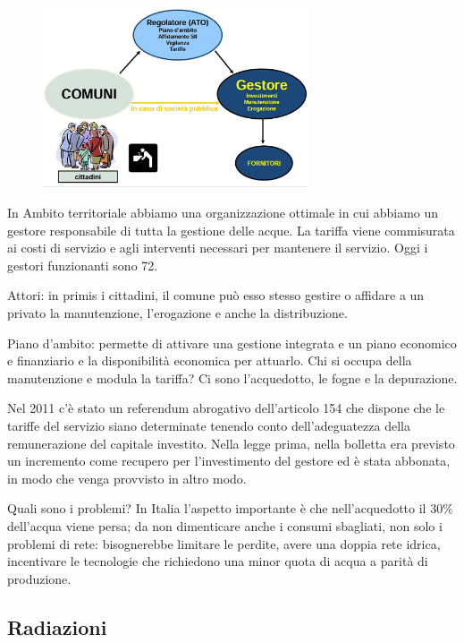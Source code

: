 \begin{figure}[!ht]
\centering
	\includegraphics[width=0.7\textwidth]{24/image4.jpeg}
	\end{figure}

In Ambito territoriale abbiamo una organizzazione ottimale in cui
abbiamo un gestore responsabile di tutta la gestione delle acque. La
tariffa viene commisurata ai costi di servizio e agli interventi
necessari per mantenere il servizio. Oggi i gestori funzionanti sono 72.

Attori: in primis i cittadini, il comune può esso stesso gestire o
affidare a un privato la manutenzione, l'erogazione e anche la
distribuzione.

Piano d'ambito: permette di attivare una gestione integrata e un piano
economico e finanziario e la disponibilità economica per attuarlo. Chi
si occupa della manutenzione e modula la tariffa? Ci sono l'acquedotto,
le fogne e la depurazione.

Nel 2011 c'è stato un referendum abrogativo dell'articolo 154 che
dispone che le tariffe del servizio siano determinate tenendo conto
dell'adeguatezza della remunerazione del capitale investito. Nella legge
prima, nella bolletta era previsto un incremento come recupero per
l'investimento del gestore ed è stata abbonata, in modo che venga
provvisto in altro modo.

Quali sono i problemi? In Italia l'aspetto importante è che
nell'acquedotto il 30\% dell'acqua viene persa; da non dimenticare anche
i consumi sbagliati, non solo i problemi di rete: bisognerebbe limitare
le perdite, avere una doppia rete idrica, incentivare le tecnologie che
richiedono una minor quota di acqua a parità di produzione.

\subsection{Radiazioni}

